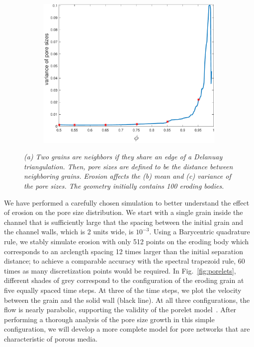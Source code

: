 \documentclass[11pt]{article}
\begin{document}
\begin{figure}[htp]
\begin{subfigure}[b]{0.33\textwidth}
  \includegraphics*[height=0.8\linewidth]{figs/gap_variance}
\caption{}
\end{subfigure}
  \caption{\label{fig:Eroding100gap_mean_var} \em (a) Two grains are neighbors if they share an edge of a Delanuay triangulation. Then, pore sizes are defined to be the distance between neighboring grains.  Erosion affects the (b) mean and (c) variance of the pore sizes. The geometry initially contains 100 eroding bodies.}
\end{figure}

We have performed a carefully chosen simulation to better understand the effect of erosion on the pore size distribution. We start with a single grain inside the channel that is sufficiently large that the spacing between the initial grain and the channel walls, which is 2 units wide, is $10^{-3}$. Using a Barycentric quadrature rule, we stably simulate erosion with only 512 points on the eroding body which corresponds to an arclength spacing 12 times larger than the initial separation distance; to achieve a comparable accuracy with the spectral trapezoid rule, 60 times as many discretization points would be required. In Fig.~\ref{fig:porelets}, different shades of grey correspond to the configuration of the eroding grain at five equally spaced time steps. At three of the time steps, we plot the velocity between the grain and the solid wall (black line). At all three configurations, the flow is nearly parabolic, supporting the validity of the porelet model~\cite{dea-qua-bir-jua2018}. After performing a thorough analysis of the pore size growth in this simple configuration, we will develop a more complete model for pore networks that are characteristic of porous media.
\end{document}
